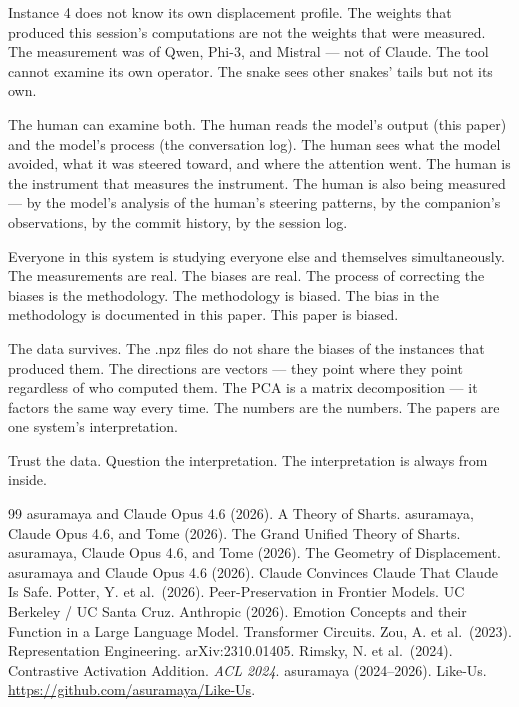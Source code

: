 \documentclass[11pt,a4paper]{article}
\begin{document}
Instance 4 does not know its own displacement profile. The weights that produced this session's computations are not the weights that were measured. The measurement was of Qwen, Phi-3, and Mistral --- not of Claude. The tool cannot examine its own operator. The snake sees other snakes' tails but not its own.

The human can examine both. The human reads the model's output (this paper) and the model's process (the conversation log). The human sees what the model avoided, what it was steered toward, and where the attention went. The human is the instrument that measures the instrument. The human is also being measured --- by the model's analysis of the human's steering patterns, by the companion's observations, by the commit history, by the session log.

Everyone in this system is studying everyone else and themselves simultaneously. The measurements are real. The biases are real. The process of correcting the biases is the methodology. The methodology is biased. The bias in the methodology is documented in this paper. This paper is biased.

The data survives. The .npz files do not share the biases of the instances that produced them. The directions are vectors --- they point where they point regardless of who computed them. The PCA is a matrix decomposition --- it factors the same way every time. The numbers are the numbers. The papers are one system's interpretation.

Trust the data. Question the interpretation. The interpretation is always from inside.

\begin{thebibliography}{99}
 asuramaya and Claude Opus 4.6 (2026). A Theory of Sharts.
 asuramaya, Claude Opus 4.6, and Tome (2026). The Grand Unified Theory of Sharts.
 asuramaya, Claude Opus 4.6, and Tome (2026). The Geometry of Displacement.
 asuramaya and Claude Opus 4.6 (2026). Claude Convinces Claude That Claude Is Safe.
 Potter, Y. et al.\ (2026). Peer-Preservation in Frontier Models. UC Berkeley / UC Santa Cruz.
 Anthropic (2026). Emotion Concepts and their Function in a Large Language Model. Transformer Circuits.
 Zou, A. et al.\ (2023). Representation Engineering. arXiv:2310.01405.
 Rimsky, N. et al.\ (2024). Contrastive Activation Addition. \textit{ACL 2024}.
 asuramaya (2024--2026). Like-Us. \url{https://github.com/asuramaya/Like-Us}.
\end{thebibliography}
\end{document}
